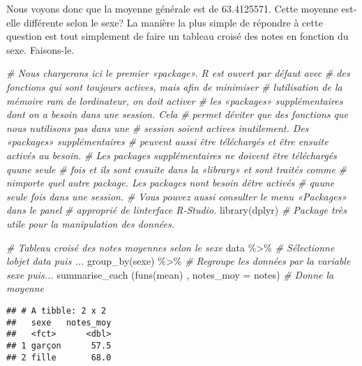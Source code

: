 \documentclass[
]{book}
\newenvironment{Shaded}{\begin{snugshade}}{\end{snugshade}}
\newcommand{\AttributeTok}[1]{\textcolor[rgb]{0.77,0.63,0.00}{#1}}
\newcommand{\CommentTok}[1]{\textcolor[rgb]{0.56,0.35,0.01}{\textit{#1}}}
\newcommand{\FunctionTok}[1]{\textcolor[rgb]{0.00,0.00,0.00}{#1}}
\newcommand{\NormalTok}[1]{#1}
\newcommand{\SpecialCharTok}[1]{\textcolor[rgb]{0.00,0.00,0.00}{#1}}
\begin{document}
Nous voyons donc que la moyenne générale est de 63.4125571. Cette moyenne est-elle différente selon le sexe? La manière la plus simple de répondre à cette question est tout simplement de faire un tableau croisé des notes en fonction du sexe. Faisons-le.

\begin{Shaded}
\begin{Highlighting}[]
\CommentTok{\# Nous chargerons ici le premier «package». R est ouvert par défaut avec}
\CommentTok{\# des fonctions qui sont toujours actives, mais afin de minimiser }
\CommentTok{\# l\textquotesingle{}utilisation de la mémoire ram de l\textquotesingle{}ordinateur, on doit activer}
\CommentTok{\# les «packages» supplémentaires dont on a besoin dans une session. Cela}
\CommentTok{\# permet d\textquotesingle{}éviter que des fonctions que nous n\textquotesingle{}utilisons pas dans une }
\CommentTok{\# session soient actives inutilement. Des «packages» supplémentaires }
\CommentTok{\# peuvent aussi être téléchargés et être ensuite activés au besoin. }
\CommentTok{\# Les packages supplémentaires ne doivent être téléchargés qu\textquotesingle{}une seule }
\CommentTok{\# fois et ils sont ensuite dans la «library» et sont traités comme }
\CommentTok{\# n\textquotesingle{}importe quel autre package. Les packages n\textquotesingle{}ont besoin d\textquotesingle{}être activés }
\CommentTok{\# qu\textquotesingle{}une seule fois dans une session. }
\CommentTok{\# Vous pouvez aussi consulter le menu «Packages» dans le panel}
\CommentTok{\# approprié de l\textquotesingle{}interface R{-}Studio.}
\FunctionTok{library}\NormalTok{(dplyr) }\CommentTok{\# Package très utile pour la manipulation des données.}

\CommentTok{\# Tableau croisé des notes moyennes selon le sexe}
\NormalTok{data }\SpecialCharTok{\%\textgreater{}\%} \CommentTok{\# Sélectionne l\textquotesingle{}objet data puis ...}
  \FunctionTok{group\_by}\NormalTok{(sexe) }\SpecialCharTok{\%\textgreater{}\%} \CommentTok{\# Regroupe les données par la variable sexe puis...}
  \FunctionTok{summarise\_each}\NormalTok{ (}\FunctionTok{funs}\NormalTok{(mean) , }\AttributeTok{notes\_moy =}\NormalTok{ notes) }\CommentTok{\# Donne la moyenne}
\end{Highlighting}
\end{Shaded}

\begin{verbatim}
## # A tibble: 2 x 2
##   sexe   notes_moy
##   <fct>      <dbl>
## 1 garçon      57.5
## 2 fille       68.0
\end{verbatim}
\end{document}
